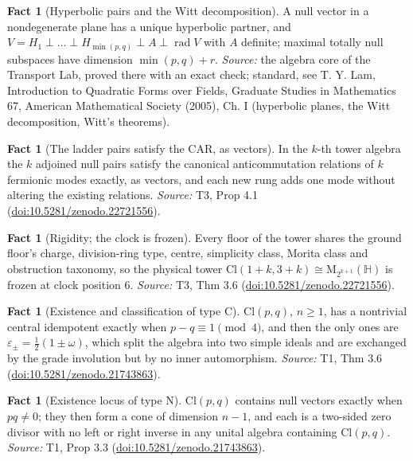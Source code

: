 \documentclass[11pt]{article}
\theoremstyle{definition}
\newtheorem{fact}[theorem]{Fact}
\theoremstyle{plain}
\providecommand{\Cl}{}\renewcommand{\Cl}{\mathrm{Cl}}
\providecommand{\HH}{}\renewcommand{\HH}{\mathbb{H}}
\providecommand{\Mat}{}\renewcommand{\Mat}{\mathrm{M}}
\begin{document}
\begin{fact}[Hyperbolic pairs and the Witt decomposition]\label{c:std-algebra.witt-decomposition}
A null vector in a nondegenerate plane has a unique hyperbolic partner, and $V = H_1 \perp \dots \perp H_{\min(p,q)} \perp A \perp \operatorname{rad} V$ with $A$ definite; maximal totally null subspaces have dimension $\min(p,q) + r$.
\emph{Source:} the algebra core of the Transport Lab, proved there with an exact check; standard, see T. Y. Lam, Introduction to Quadratic Forms over Fields, Graduate Studies in Mathematics 67, American Mathematical Society (2005), Ch. I (hyperbolic planes, the Witt decomposition, Witt's theorems).
\end{fact}

\begin{fact}[The ladder pairs satisfy the CAR, as vectors]\label{c:tower.ladder-pairs-satisfy-car-vectors}
In the $k$-th tower algebra the $k$ adjoined null pairs satisfy the canonical anticommutation relations of $k$ fermionic modes exactly, as vectors, and each new rung adds one mode without altering the existing relations.
\emph{Source:} T3, Prop 4.1 (\href{https://doi.org/10.5281/zenodo.22721556}{doi:10.5281/zenodo.22721556}).
\end{fact}

\begin{fact}[Rigidity; the clock is frozen]\label{c:tower.rigidity-clock-frozen}
Every floor of the tower shares the ground floor's charge, division-ring type, centre, simplicity class, Morita class and obstruction taxonomy, so the physical tower $\Cl(1{+}k, 3{+}k) \cong \Mat_{2^{k+1}}(\HH)$ is frozen at clock position $6$.
\emph{Source:} T3, Thm 3.6 (\href{https://doi.org/10.5281/zenodo.22721556}{doi:10.5281/zenodo.22721556}).
\end{fact}

\begin{fact}[Existence and classification of type C]\label{c:transport.existence-classification-type-c}
$\Cl(p,q)$, $n \geq 1$, has a nontrivial central idempotent exactly when $p - q \equiv 1 \pmod 4$, and then the only ones are $\varepsilon_\pm = \tfrac12(1 \pm \omega)$, which split the algebra into two simple ideals and are exchanged by the grade involution but by no inner automorphism.
\emph{Source:} T1, Thm 3.6 (\href{https://doi.org/10.5281/zenodo.21743863}{doi:10.5281/zenodo.21743863}).
\end{fact}

\begin{fact}[Existence locus of type N]\label{c:transport.existence-locus-type-n}
$\Cl(p,q)$ contains null vectors exactly when $pq \neq 0$; they then form a cone of dimension $n - 1$, and each is a two-sided zero divisor with no left or right inverse in any unital algebra containing $\Cl(p,q)$.
\emph{Source:} T1, Prop 3.3 (\href{https://doi.org/10.5281/zenodo.21743863}{doi:10.5281/zenodo.21743863}).
\end{fact}
\end{document}
